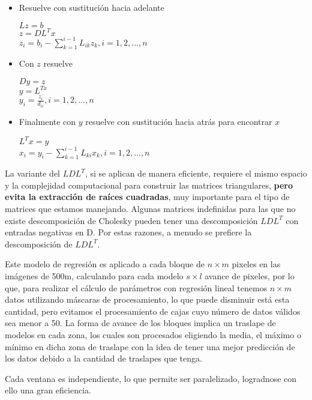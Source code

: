 {\begin{itemize}
\item Resuelve con sustitución hacia adelante
\begin{center}
$Lz = b$\\
$z = DL^{T}x$\\
$z_{i} = b_{i} - \sum_{k=1}^{i-1}L_{ik}z_{k}, i=1,2,...,n$
\end{center}
\item Con $z$ resuelve
\begin{center}
$Dy = z$\\
$y = L^{Tx}$\\
$y_{i} = \frac{z_{i}}{d_{ii}}, i=1,2,...,n$
\end{center}
\item Finalmente con $y$ resuelve con sustitución hacia atrás para encontrar $x$
\begin{center}
$L^{T}x = y$\\
$x_{i} = y_{i} - \sum_{k=1}^{i-1}L_{ki}x_{k}, i=1,2,...,n$
\end{center}
\end{itemize}

La variante del $LDL^{T}$, si se aplican de manera eficiente, requiere el mismo espacio y la complejidad computacional para construir las matrices triangulares, \textbf{pero evita la extracción de raíces cuadradas}, muy importante para el tipo de matrices que estamos manejando. Algunas matrices indefinidas para las que no existe descomposición de Cholesky pueden tener una descomposición $LDL^{T}$ con entradas negativas en D. Por estas razones, a menudo se prefiere la descomposición de $LDL^{T}$. }

Este modelo de regresión es aplicado a cada bloque de $n \times m$ pixeles en las imágenes de 500m, calculando para cada modelo $s \times l$ avance de pixeles, por lo que, para realizar el cálculo de parámetros con regresión lineal tenemos $n \times m$ datos utilizando máscaras de procesamiento, lo que puede disminuir está esta cantidad, pero evitamos el procesamiento de cajas cuyo número de datos válidos sea menor a 50. La forma de avance de los bloques implica un traslape de modelos en cada zona, los cuales son procesados eligiendo la media, el máximo o mínimo en dicha zona de traslape con la idea de tener una mejor predicción de los datos debido a la cantidad de traslapes que tenga. 

Cada ventana es independiente, lo que permite ser paralelizado, logradnose con ello una gran eficiencia. 

